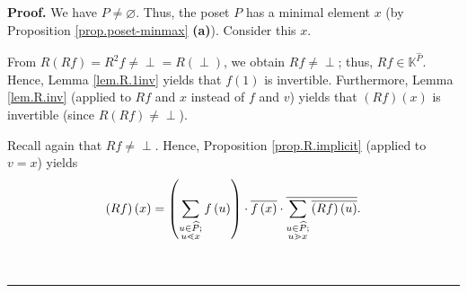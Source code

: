 \documentclass[numbers=enddot,12pt,final,onecolumn,notitlepage]{scrartcl}%
\theoremstyle{definition}
\newenvironment{verlong}{}{}
\newcommand{\undf}{\operatorname*{\bot}}
\newenvironment{proof}[1][Proof]{\noindent\textbf{#1.} }{\ \rule{0.5em}{0.5em}}
\let\sumnonlimits\sum
\renewcommand{\sum}{\sumnonlimits\limits}
\begin{document}
\begin{verlong}
\begin{proof}
We have $P\neq\varnothing$. Thus, the poset $P$ has a minimal element $x$ (by
Proposition \ref{prop.poset-minmax} \textbf{(a)}). Consider this $x$.

From $R\left(  Rf\right)  =R^{2}f\neq\undf=R\left(  \undf\right)  $, we obtain
$Rf\neq\undf$; thus, $Rf\in\mathbb{K}^{\widehat{P}}$. Hence, Lemma
\ref{lem.R.1inv} yields that $f\left(  1\right)  $ is invertible. Furthermore,
Lemma \ref{lem.R.inv} (applied to $Rf$ and $x$ instead of $f$ and $v$) yields
that $\left(  Rf\right)  \left(  x\right)  $ is invertible (since $R\left(
Rf\right)  \neq\undf$).

Recall again that $Rf\neq\undf$. Hence, Proposition \ref{prop.R.implicit}
(applied to $v=x$) yields%
\begin{equation}
\left(  Rf\right)  \left(  x\right)  =\left(  \sum\limits_{\substack{u\in
\widehat{P};\\u\lessdot x}}f\left(  u\right)  \right)  \cdot\overline{f\left(
x\right)  }\cdot\overline{\sum\limits_{\substack{u\in\widehat{P};\\u\gtrdot
x}}\overline{\left(  Rf\right)  \left(  u\right)  }}. \label{pf.lem.R.01inv.1}%
\end{equation}



\end{proof}
\end{verlong}
\end{document}
